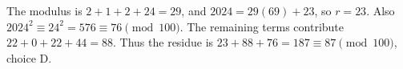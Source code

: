 The modulus is $2+1+2+24=29$, and $2024=29(69)+23$, so $r=23$. Also $2024^2\equiv24^2=576\equiv76\pmod{100}$. The remaining terms contribute $22+0+22+44=88$. Thus the residue is $23+88+76=187\equiv\boxed{87}\pmod{100}$, choice D.
